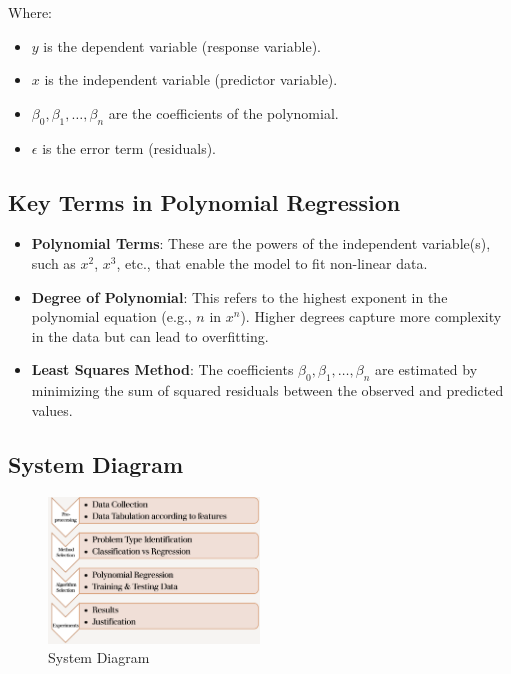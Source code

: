 \documentclass[12pt]{book} %
\begin{document}
Where:
\begin{itemize}
    \item $y$ is the dependent variable (response variable).
    \item $x$ is the independent variable (predictor variable).
    \item $\beta_0, \beta_1, \dots, \beta_n$ are the coefficients of the polynomial.
    \item $\epsilon$ is the error term (residuals).
\end{itemize}

\subsection{Key Terms in Polynomial Regression}
\begin{itemize}
    \item \textbf{Polynomial Terms}: These are the powers of the independent variable(s), such as $x^2$, $x^3$, etc., that enable the model to fit non-linear data.
    \item \textbf{Degree of Polynomial}: This refers to the highest exponent in the polynomial equation (e.g., $n$ in $x^n$). Higher degrees capture more complexity in the data but can lead to overfitting.
    \item \textbf{Least Squares Method}: The coefficients $\beta_0, \beta_1, \dots, \beta_n$ are estimated by minimizing the sum of squared residuals between the observed and predicted values.
\end{itemize}



\subsection{System Diagram}


\begin{figure}[h]
	\begin{center}
		\includegraphics[width=0.5\textwidth]{assets/sysdiagram.png} 
	\end{center}
	\caption{System Diagram} %
	\label{fig:systemdiagram}
\end{figure}
\end{document}
